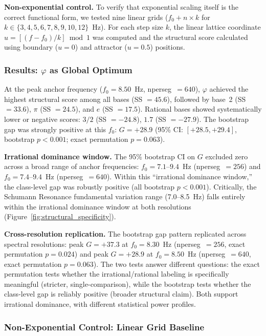 \documentclass[11pt,a4paper]{article}
\newcommand{\phisym}{\varphi}
\begin{document}
\textbf{Non-exponential control.} To verify that exponential scaling itself is the correct functional form, we tested nine linear grids ($f_0 + n \times k$ for $k \in \{3, 4, 5, 6, 7, 8, 9, 10, 12\}$~Hz). For each step size $k$, the linear lattice coordinate $u = [(f - f_0)/k] \bmod 1$ was computed and the structural score calculated using boundary ($u = 0$) and attractor ($u = 0.5$) positions.

\subsubsection{Results: $\phisym$ as Global Optimum}
\label{sec:study4_results}

At the peak anchor frequency ($f_0 = 8.50$~Hz, nperseg~$= 640$), $\phisym$ achieved the highest structural score among all bases (SS $= 45.6$), followed by base~2 (SS $= 33.6$), $\pi$ (SS $= 24.5$), and $e$ (SS $= 17.5$). Rational bases showed systematically lower or negative scores: $3/2$ (SS $= -24.8$), $1.7$ (SS $= -27.9$). The bootstrap gap was strongly positive at this $f_0$: $G = +28.9$ (95\% CI: $[+28.5, +29.4]$, bootstrap $p < 0.001$; exact permutation $p = 0.063$).

\textbf{Irrational dominance window.} The 95\% bootstrap CI on $G$ excluded zero across a broad range of anchor frequencies: $f_0 = 7.1$--$9.4$~Hz (nperseg~$= 256$) and $f_0 = 7.4$--$9.4$~Hz (nperseg~$= 640$). Within this ``irrational dominance window,'' the class-level gap was robustly positive (all bootstrap $p < 0.001$). Critically, the Schumann Resonance fundamental variation range (7.0--8.5~Hz) falls entirely within the irrational dominance window at both resolutions (Figure~\ref{fig:structural_specificity}).

\textbf{Cross-resolution replication.} The bootstrap gap pattern replicated across spectral resolutions: peak $G = +37.3$ at $f_0 = 8.30$~Hz (nperseg~$= 256$, exact permutation $p = 0.024$) and peak $G = +28.9$ at $f_0 = 8.50$~Hz (nperseg~$= 640$, exact permutation $p = 0.063$). The two tests answer different questions: the exact permutation tests whether the irrational/rational labeling is specifically meaningful (stricter, single-comparison), while the bootstrap tests whether the class-level gap is reliably positive (broader structural claim). Both support irrational dominance, with different statistical power profiles.

\subsubsection{Non-Exponential Control: Linear Grid Baseline}
\label{sec:study4_linear}
\end{document}
